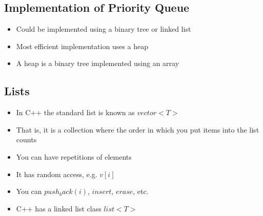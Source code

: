 \begin{slide}
\section{Implementation of Priority Queue}

\begin{PauseHighLight}
  \begin{itemize}
  \item Could be implemented using a binary tree or linked list\pause
  \item Most efficient implementation uses a heap\pause
  \item A heap is a binary tree implemented using an array\pause
  \end{itemize}

\end{PauseHighLight}

\end{slide}


\Outline


\begin{slide}
\section{Lists}

\begin{PauseHighLight}
  \begin{itemize}
  \item In C++ the standard list is known as \jl$vector<T>$\pause
  \item That is, it is a collection where the order in which you put
    items into the list counts\pause
  \item You can have repetitions of elements\pause
  \item It has random access, e.g. \jl$v[i]$\pause
  \item You can \jl$push_back(i)$, \jl$insert$, \jl$erase$, etc.\pause
  \item C++ has a linked list class \jl$list<T>$\pause
  \end{itemize}
\end{PauseHighLight}

\end{slide}


